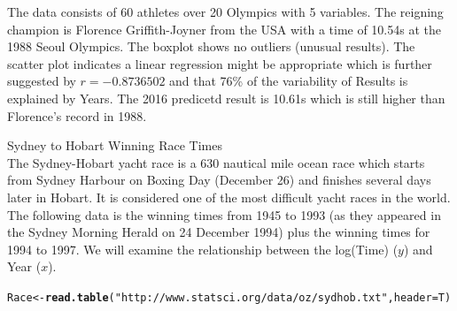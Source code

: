 \documentclass[bigtut]{tutorial}\usepackage[]{graphicx}\usepackage[]{color}
\makeatletter
\newcommand{\hlnum}[1]{\textcolor[rgb]{0.686,0.059,0.569}{#1}}%
\newcommand{\hlstr}[1]{\textcolor[rgb]{0.192,0.494,0.8}{#1}}%
\newcommand{\hlopt}[1]{\textcolor[rgb]{0,0,0}{#1}}%
\newcommand{\hlstd}[1]{\textcolor[rgb]{0.345,0.345,0.345}{#1}}%
\newcommand{\hlkwb}[1]{\textcolor[rgb]{0.69,0.353,0.396}{#1}}%
\newcommand{\hlkwc}[1]{\textcolor[rgb]{0.333,0.667,0.333}{#1}}%
\newcommand{\hlkwd}[1]{\textcolor[rgb]{0.737,0.353,0.396}{\textbf{#1}}}%
\newenvironment{kframe}{%
 \def\at@end@of@kframe{}%
 \ifinner\ifhmode%
  \def\at@end@of@kframe{\end{minipage}}%
  \begin{minipage}{\columnwidth}%
 \fi\fi%
 \def\FrameCommand##1{\hskip\@totalleftmargin \hskip-\fboxsep
 \colorbox{shadecolor}{##1}\hskip-\fboxsep
     \hskip-\linewidth \hskip-\@totalleftmargin \hskip\columnwidth}%
 \MakeFramed {\advance\hsize-\width
   \@totalleftmargin\z@ \linewidth\hsize
   \@setminipage}}%
 {\par\unskip\endMakeFramed%
 \at@end@of@kframe}
\newenvironment{knitrout}{}{} %
\makeatother
\begin{document}
\begin{tutorial}
\begin{questions}


\begin{solution}
The data consists of 60 athletes over 20 Olympics with 5 variables. The reigning champion is Florence Griffith-Joyner from the USA with a time of 10.54s at the 1988 Seoul Olympics. The boxplot shows no outliers (unusual results). The scatter plot indicates a linear regression might be appropriate which is further suggested by $r=-0.8736502$ and that 76\% of the variability of Results is explained by Years. The 2016 predicetd result is 10.61s which is still higher than Florence's record in 1988.
\end{solution} 


\question Sydney to Hobart Winning Race Times \\

The Sydney-Hobart yacht race is a 630 nautical mile ocean race which starts from Sydney Harbour on Boxing Day (December 26) and finishes several days later in Hobart. It is considered one of the most difficult yacht races in the world. The following data is the winning times from 1945 to 1993 (as they appeared in the Sydney Morning Herald on 24 December 1994) plus the winning times for 1994 to 1997. We will examine the relationship between the log(Time) ($y$) and Year ($x$).

\begin{knitrout}
\color{fgcolor}\begin{kframe}
\begin{alltt}
\hlstd{Race} \hlkwb{<-} \hlkwd{read.table}\hlstd{(}\hlstr{"http://www.statsci.org/data/oz/sydhob.txt"}\hlstd{,}\hlkwc{header}\hlstd{=T)}
\end{alltt}
\end{kframe}
\end{knitrout}


\end{questions}
\end{tutorial}
\end{document}
